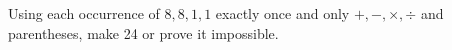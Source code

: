 Using each occurrence of $8,8,1,1$ exactly once and only $+,-,\times,\div$ and parentheses, make 24 or prove it impossible.
